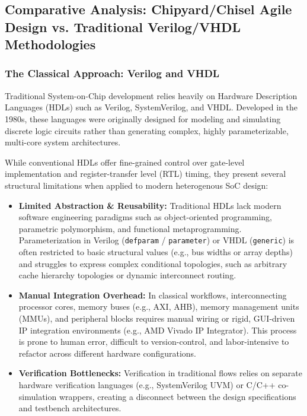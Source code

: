 \documentclass[12pt,a4paper]{article}
\begin{document}
\subsection{Comparative Analysis: Chipyard/Chisel Agile Design vs. Traditional Verilog/VHDL Methodologies}

\subsubsection{The Classical Approach: Verilog and VHDL}
Traditional System-on-Chip development relies heavily on Hardware Description Languages (HDLs) such as Verilog, SystemVerilog, and VHDL. Developed in the 1980s, these languages were originally designed for modeling and simulating discrete logic circuits rather than generating complex, highly parameterizable, multi-core system architectures.

While conventional HDLs offer fine-grained control over gate-level implementation and register-transfer level (RTL) timing, they present several structural limitations when applied to modern heterogenous SoC design:

\begin{itemize}
    \item \textbf{Limited Abstraction \& Reusability:} Traditional HDLs lack modern software engineering paradigms such as object-oriented programming, parametric polymorphism, and functional metaprogramming. Parameterization in Verilog (\texttt{defparam} / \texttt{parameter}) or VHDL (\texttt{generic}) is often restricted to basic structural values (e.g., bus widths or array depths) and struggles to express complex conditional topologies, such as arbitrary cache hierarchy topologies or dynamic interconnect routing.
    \item \textbf{Manual Integration Overhead:} In classical workflows, interconnecting processor cores, memory buses (e.g., AXI, AHB), memory management units (MMUs), and peripheral blocks requires manual wiring or rigid, GUI-driven IP integration environments (e.g., AMD Vivado IP Integrator). This process is prone to human error, difficult to version-control, and labor-intensive to refactor across different hardware configurations.
    \item \textbf{Verification Bottlenecks:} Verification in traditional flows relies on separate hardware verification languages (e.g., SystemVerilog UVM) or C/C++ co-simulation wrappers, creating a disconnect between the design specifications and testbench architectures.
\end{itemize}
\end{document}
